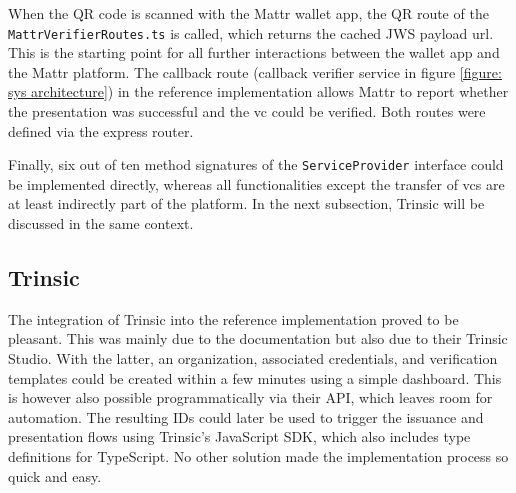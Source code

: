         When the QR code is scanned with the Mattr wallet app, the QR route of the \texttt{MattrVerifierRoutes.ts} is called, which returns the cached JWS payload url. This is the starting point for all further interactions between the wallet app and the Mattr platform. The callback route (callback verifier service in figure \ref{figure: sys architecture}) in the reference implementation allows Mattr to report whether the presentation was successful and the \ac{vc} could be verified. Both routes were defined via the express router.
        
        Finally, six out of ten method signatures of the \texttt{ServiceProvider} interface could be implemented directly, whereas all functionalities except the transfer of \acp{vc} are at least indirectly part of the platform. In the next subsection, Trinsic will be discussed in the same context.
    
        \subsection{Trinsic}\label{subsection: trinsic}
        
            The integration of Trinsic into the reference implementation proved to be pleasant. This was mainly due to the documentation but also due to their Trinsic Studio. With the latter, an organization, associated credentials, and verification templates could be created within a few minutes using a simple dashboard. This is however also possible programmatically via their API, which leaves room for automation. The resulting IDs could later be used to trigger the issuance and presentation flows using Trinsic's JavaScript SDK, which also includes type definitions for TypeScript. No other solution made the implementation process so quick and easy.
    
